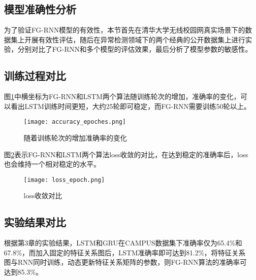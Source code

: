 \subsection{模型准确性分析}
为了验证FG-RNN模型的有效性，本节首先在清华大学无线校园网真实场景下的数据集上开展有效性评估，随后在异常检测领域下的两个经典的公开数据集上进行实验，分别对比了FG-RNN和多个模型的评估效果，最后分析了模型参数的敏感性。


\subsection{训练过程对比}
图\ref{fig:随着训练轮次的增加准确率的变化}中横坐标为FG-RNN和LSTM两个算法随训练轮次的增加，准确率的变化，可以看出LSTM训练时间更短，大约25轮即可稳定，而FG-RNN需要训练50轮以上。

\begin{figure}[H]
    \centering
    \texttt{[image: accuracy\_epoches.png]}
    \caption{随着训练轮次的增加准确率的变化}
    \label{fig:随着训练轮次的增加准确率的变化}
  \end{figure}

图\ref{fig:loss收敛对比}表示FG-RNN和LSTM两个算法loss收敛的对比，在达到稳定的准确率后，loss也会维持一个相对稳定的水平。
  \begin{figure}[H]
    \centering
    \texttt{[image: loss\_epoch.png]}
    \caption{loss收敛对比}
    \label{fig:loss收敛对比}
  \end{figure}

\subsection{实验结果对比}

根据第3章的实验结果，LSTM和GRU在CAMPUS数据集下准确率仅为65.4\%和67.8\%，而加入固定的特征关系图后，LSTM准确率即可达到81.2\%，将特征关系图与RNN同时训练，动态更新特征关系矩阵的参数，则FG-RNN算法的准确率可达到85.3\%。






